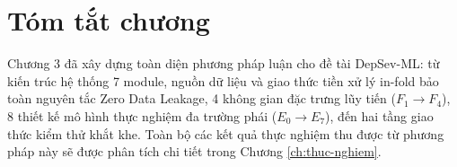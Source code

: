\section{Tóm tắt chương}
\label{sec:tom-tat-chuong-3}

Chương 3 đã xây dựng toàn diện phương pháp luận cho đề tài DepSev-ML: từ kiến trúc hệ thống 7 module, nguồn dữ liệu và giao thức tiền xử lý in-fold bảo toàn nguyên tắc Zero Data Leakage, 4 không gian đặc trưng lũy tiến ($F_1 \to F_4$), 8 thiết kế mô hình thực nghiệm đa trường phái ($E_0 \to E_7$), đến hai tầng giao thức kiểm thử khắt khe. Toàn bộ các kết quả thực nghiệm thu được từ phương pháp này sẽ được phân tích chi tiết trong Chương \ref{ch:thuc-nghiem}.

